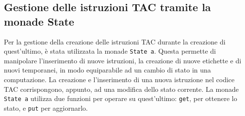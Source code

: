 \subsection{Gestione delle istruzioni TAC tramite la monade State}

Per la gestione della creazione delle istruzioni TAC durante la creazione di quest'ultimo, è stata utilizzata la monade {\tt State a}. Questa permette di manipolare l'inserimento di nuove istruzioni, la creazione di nuove etichette e di nuovi temporanei, in modo equiparabile ad un cambio di stato in una computazione. La creazione e l'inserimento di una nuova istruzione nel codice TAC corrispongono, appunto, ad una modifica dello stato corrente. La monade {\tt State a} utilizza due funzioni per operare su quest'ultimo: {\tt get}, per ottenere lo stato, e {\tt put} per aggiornarlo. 

